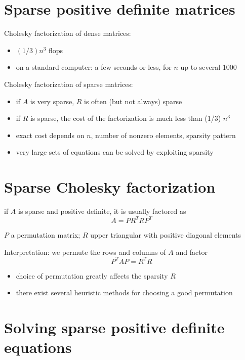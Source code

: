 \section{Sparse positive definite matrices}

Cholesky factorization of dense matrices:
\begin{itemize}
    \item $ (1 / 3) n^{3} $ flops
    \item on a standard computer: a few seconds or less, for $ n $ up to several 1000
\end{itemize}

Cholesky factorization of sparse matrices:
\begin{itemize}
    \item if $ A $ is very sparse, $ R $ is often (but not always) sparse
    \item if $ R $ is sparse, the cost of the factorization is much less than (1/3) $ n^{3} $
    \item exact cost depends on $ n $, number of nonzero elements, sparsity pattern
    \item very large sets of equations can be solved by exploiting sparsity
\end{itemize}

\section{Sparse Cholesky factorization}

\begin{theorem}
    if $ A $ is sparse and positive definite, it is usually factored as
$$
A=P R^{T} R P^{T}
$$

$ P $ a permutation matrix; $ R $ upper triangular with positive diagonal elements
\end{theorem}

Interpretation: we permute the rows and columns of $ A $ and factor
$$
P^{T} A P=R^{T} R
$$

\begin{itemize}
    \item choice of permutation greatly affects the sparsity $ R $
    \item there exist several heuristic methods for choosing a good permutation
\end{itemize}


\section{Solving sparse positive definite equations}

